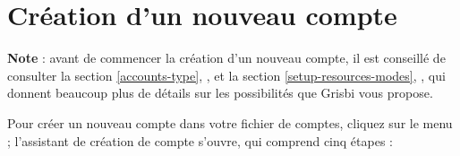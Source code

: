 \section{Création d'un nouveau compte\label{accounts-new}}


\textbf{Note} : avant de commencer la création d'un nouveau compte, il est conseillé de consulter la section \vref{accounts-type}, , et la section \vref{setup-resources-modes}, , qui donnent beaucoup plus de détails sur les possibilités que Grisbi vous propose.

Pour créer un nouveau compte dans votre fichier de comptes, cliquez sur le menu  ; l'assistant de création de compte
s'ouvre, qui comprend cinq étapes :

